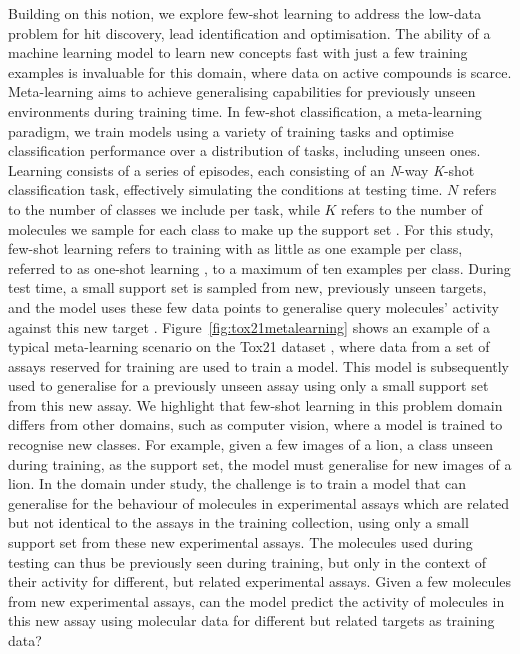 \documentclass[journal=jcisd8,manuscript=article]{achemso} %
\begin{document}
Building on this notion, we explore few-shot learning to address the low-data problem for hit discovery, lead identification and optimisation. The ability of a machine learning model to learn new concepts fast with just a few training examples is invaluable for this domain, where data on active compounds is scarce. Meta-learning aims to achieve generalising capabilities for previously unseen environments during training time. In few-shot classification, a meta-learning paradigm, we train models using a variety of training tasks and optimise classification performance over a distribution of tasks, including unseen ones. Learning consists of a series of episodes, each consisting of an \textit{N}-way \textit{K}-shot classification task, effectively simulating the conditions at testing time. $N$ refers to the number of classes we include per task, while $K$ refers to the number of molecules we sample for each class to make up the support set \cite{snell2017prototypical}. For this study, few-shot learning refers to training with as little as one example per class, referred to as one-shot learning \cite{koch2015siamese, vinyals2016matching}, to a maximum of ten examples per class. During test time, a small support set is sampled from new, previously unseen targets, and the model uses these few data points to generalise query molecules' activity against this new target \cite{vinyals2016matching}. Figure~\ref{fig:tox21metalearning} shows an example of a typical meta-learning scenario on the Tox21 dataset \citep{huang2016tox21challenge}, where data from a set of assays reserved for training are used to train a model. This model is subsequently used to generalise for a previously unseen assay using only a small support set from this new assay. We highlight that few-shot learning in this problem domain differs from other domains, such as computer vision, where a model is trained to recognise new classes. For example, given a few images of a lion, a class unseen during training, as the support set, the model must generalise for new images of a lion. In the domain under study, the challenge is to train a model that can generalise for the behaviour of molecules in experimental assays which are related but not identical to the assays in the training collection, using only a small support set from these new experimental assays. The molecules used during testing can thus be previously seen during training, but only in the context of their activity for different, but related experimental assays. Given a few molecules from new experimental assays, can the model predict the activity of molecules in this new assay using molecular data for different but related targets as training data?
\end{document}
